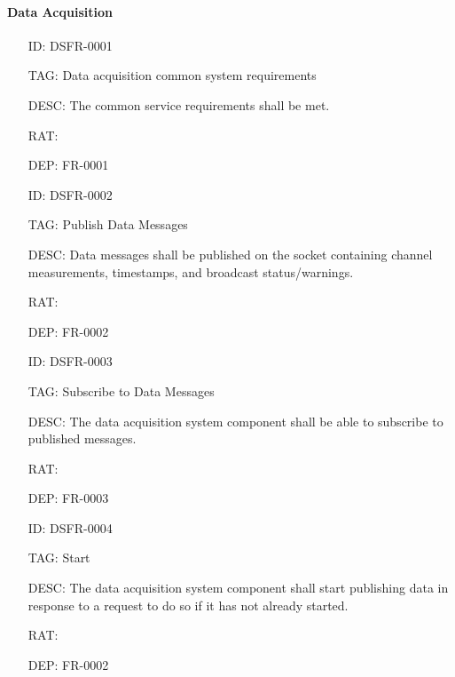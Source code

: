       \paragraph{Data Acquisition}

        \begin{itemize}
          \setlength{\itemindent}{.5in}
          \itemsep .15em
          \item[ID:] DSFR-0001
          \item[TAG:] Data acquisition common system requirements
          \item[DESC:] The common service requirements shall be met.
          \item[RAT:]
          \item[DEP:] FR-0001
        \end{itemize}

        \begin{itemize}
          \setlength{\itemindent}{.5in}
          \itemsep .15em
          \item[ID:] DSFR-0002
          \item[TAG:] Publish Data Messages
          \item[DESC:] Data messages shall be published on the socket
            containing channel measurements, timestamps, and broadcast
            status/warnings.
          \item[RAT:]
          \item[DEP:] FR-0002
        \end{itemize}

        \begin{itemize}
          \setlength{\itemindent}{.5in}
          \itemsep .15em
          \item[ID:] DSFR-0003
          \item[TAG:] Subscribe to Data Messages
          \item[DESC:] The data acquisition system component shall be able to
            subscribe to published messages.
          \item[RAT:]
          \item[DEP:] FR-0003
        \end{itemize}

        \begin{itemize}
          \setlength{\itemindent}{.5in}
          \itemsep .15em
          \item[ID:] DSFR-0004
          \item[TAG:] Start
          \item[DESC:] The data acquisition system component shall start
            publishing data in response to a request to do so if it has not
            already started.
          \item[RAT:]
          \item[DEP:] FR-0002
        \end{itemize}

